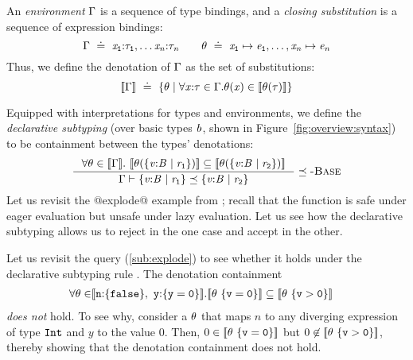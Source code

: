 An \emph{environment} $\Gamma$ is a sequence of type bindings,
and a \emph{closing substitution} \sto\xspace is a sequence of expression bindings:
$$\Gamma \ \doteq\  \mathtt{\mathit{x}_1}\text{:}\mathtt{\mathit{\tau}_1},\ldots\mathtt{\mathit{x}_\mathit{n}}\text{:}\mathtt{\mathit{\tau}_\mathit{n}} \qquad
  \theta \ \doteq\  \mathtt{\mathit{x}_1} \mapsto \mathtt{\mathit{e}_1}, \ldots, \mathtt{\mathit{x}_\mathit{n}} \mapsto \mathtt{\mathit{e}_\mathit{n}}$$ %
Thus, we define the denotation of $\Gamma$ as the set of substitutions:
$$[\![\Gamma]\!] \ \doteq\  \{\theta \mid \forall \mathtt{\mathit{x}}\text{:}\mathtt{\mathit{\tau}} \in \Gamma. \theta(\mathit{x}) \in [\![\theta(\mathit{\tau})]\!] \}$$

Equipped with interpretations for types and environments, 
we define the \emph{declarative subtyping} \rtdsub 
(over basic types $\mathit{b}$, shown in Figure~\ref{fig:overview:syntax}) 
to be containment between the types' denotations:
$$
\inference
  {\forall \sto\in \interp{\env}.\  
  		 \interp{\thetasub{\sto}{\tttref{\vv}{\Base}{}{\refi_1}}} 
  		\subseteq   \interp{\thetasub{\sto}{\tttref{\vv}{\Base}{}{\refi_2}}}}
  {\issubtype{\env}{\tttref{\vv}{\Base}{}{\refi_1}}{\tttref{\vv}{\Base}{}{\refi_2}}}
  \rtdsub
$$
%
Let us revisit the @explode@ example from ; 
recall that the function is safe under eager evaluation but unsafe under 
lazy evaluation. Let us see how the declarative subtyping allows us to 
reject in the one case and accept in the other.

Let us revisit the query (\ref{sub:explode}) to see whether it
holds under the declarative subtyping rule \rtdsub. The denotation
containment
%
\begin{align}
\label{con:explode}
   \forall \sto \in &\interp{
   		\ttbind{n}{\ttref{\ttfalse}},\ \ttbind{y}{\ttref{y = 0}}
   		}. 
     \interp{{{\sto}\ {\ttref{v = 0}}}} \subseteq \interp{{\sto}\ {\ttref{v > 0}}} 
\end{align}
%
\emph{does not} hold. To see why, consider a $\theta$ that maps 
$n$ to any diverging expression of type $\mathtt{Int}$ and $y$ 
to the value $0$.
%
Then, $0 \in [\![\theta\ \mathtt{\{v = 0\}}]\!]$ but $0 \not \in \interp{\sto\ \ttref{v > 0}}$, 
thereby showing that the denotation containment does not hold.


